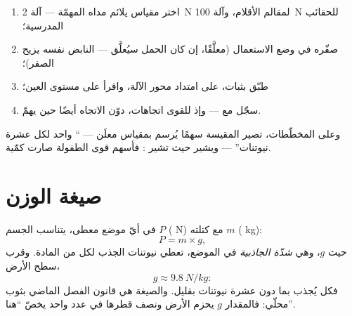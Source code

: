 \begin{method}\label{met:g9:weight-vs-mass:measure}
\begin{enumerate}
  \item اختر مقياس  يلائم مداه المهمّة --- آلة \qty{2}{N}
        لمقالم الأقلام، وآلة \qty{100}{N} للحقائب المدرسية؛
  \item صفّره في وضع الاستعمال (معلَّقًا، إن كان الحمل
        سيُعلَّق ---  النابض نفسه يزيح الصفر)؛
  \item طبّق  بثبات، على امتداد محور الآلة، واقرأ على
        مستوى العين؛
  \item سجّل مع  --- وإذ للقوى اتجاهات، دوّن الاتجاه
        أيضًا حين يهمّ.
\end{enumerate}
وعلى المخطّطات، تصير  المقيسة سهمًا يُرسم بمقياس معلَن ---
`` واحد لكل عشرة نيوتنات'' --- ويشير حيث تشير :
فأسهم قوى الطفولة صارت كمّية.
\end{method}

\section{صيغة الوزن}

\begin{proposition}\label{prop:g9:weight-vs-mass:formula}
في أيّ موضع معطى، يتناسب  الجسم $P$ ( \unit{N}) مع
كتلته $m$ ( \unit{kg}):
\[
P = m \times g ,
\]
حيث $g$، وهي \emph{شدّة الجاذبية} في
الموضع، تعطي نيوتنات الجذب لكل  من المادة. وقرب سطح
الأرض،
\[
g \approx \qty{9.8}{N/kg}:
\]
فكل  يُجذب بما دون عشرة نيوتنات بقليل. والصيغة هي
قانون الفصل الماضي بثوب محلّي: فالمقدار $g$ يحزم  الأرض
ونصف قطرها في عدد واحد يخصّ ``هنا''.
\end{proposition}

